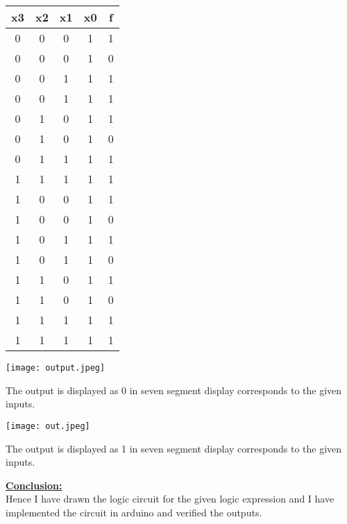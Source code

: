 \documentclass[10pt,a4paper]{report}
\begin{document}
\begin{table}[ht]
\centering %
\begin{tabular}{c c c c c} %
\hline\hline %
x3 & x2 & x1 &x0 & f\\ [0.5ex] %
\hline
0 & 0 & 0 & 1 & 1 \\
0 & 0 & 0 & 1 & 0 \\
0 & 0 & 1 & 1 & 1 \\
0 & 0 & 1 & 1 & 1 \\
0 & 1 & 0 & 1 & 1 \\
0 & 1 & 0 & 1 & 0 \\
0 & 1 & 1 & 1 & 1 \\
1 & 1 & 1 & 1 & 1 \\
1 & 0 & 0 & 1 & 1 \\
1 & 0 & 0 & 1 & 0 \\
1 & 0 & 1 & 1 & 1 \\
1 & 0 & 1 & 1 & 0 \\
1 & 1 & 0 & 1 & 1 \\
1 & 1 & 0 & 1 & 0 \\
1 & 1 & 1 & 1 & 1 \\
1 & 1 & 1 & 1 & 1 \\
\hline
\end{tabular}
\end{table}
\raggedright \begin{center} \texttt{[image: output.jpeg]} \end{center} \begin{center} The output is displayed as 0 in seven segment display corresponds to the given inputs. \end{center}
\vspace{5mm}
\raggedright \begin{center} \texttt{[image: out.jpeg]} \end{center}
\begin{center} The output is displayed as 1 in seven segment display corresponds to the given inputs. \end{center}
\vspace{5mm}
\raggedright \textbf{\underline{Conclusion:}}\vspace{7mm}
\\ Hence I have drawn the logic circuit for the given logic expression and I have implemented the circuit in arduino and verified the outputs.
\end{document}
